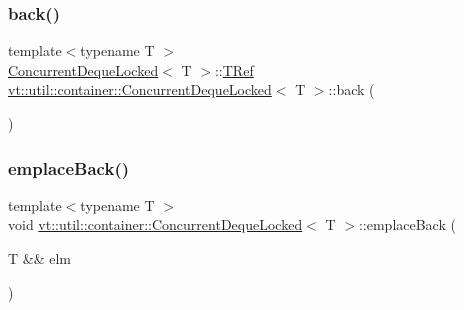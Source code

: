 \mbox{\label{structvt_1_1util_1_1container_1_1_concurrent_deque_locked_ad38ab2b6cb582a65107ef74bcf678f09}} 
\subsubsection{\texorpdfstring{back()}{back()}\hspace{0.1cm}{\footnotesize\ttfamily [2/2]}}
{\footnotesize\ttfamily template$<$typename T $>$ \\
\hyperlink{structvt_1_1util_1_1container_1_1_concurrent_deque_locked}{Concurrent\+Deque\+Locked}$<$ T $>$\+::\hyperlink{structvt_1_1util_1_1container_1_1_concurrent_deque_locked_a4451b0e7f6c8aa741f98a77a9fed353e}{T\+Ref} \hyperlink{structvt_1_1util_1_1container_1_1_concurrent_deque_locked}{vt\+::util\+::container\+::\+Concurrent\+Deque\+Locked}$<$ T $>$\+::back (\begin{DoxyParamCaption}{ }\end{DoxyParamCaption})}

\mbox{\label{structvt_1_1util_1_1container_1_1_concurrent_deque_locked_a4d9bbc1980dba1ffdc3ba8f8eb2c52d5}} 
\subsubsection{\texorpdfstring{emplace\+Back()}{emplaceBack()}}
{\footnotesize\ttfamily template$<$typename T $>$ \\
void \hyperlink{structvt_1_1util_1_1container_1_1_concurrent_deque_locked}{vt\+::util\+::container\+::\+Concurrent\+Deque\+Locked}$<$ T $>$\+::emplace\+Back (\begin{DoxyParamCaption}\item[{T \&\&}]{elm }\end{DoxyParamCaption})}

